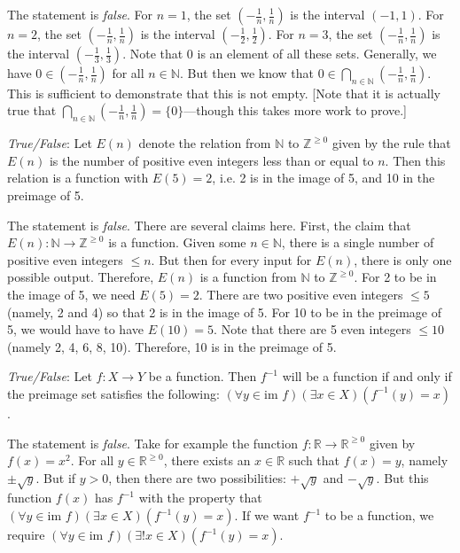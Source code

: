 \documentclass[11pt,letterpaper]{article}
\begin{document}
\sol The statement is \textit{false}. For $n= 1$, the set $(-\frac{1}{n}, \frac{1}{n})$ is the interval $(-1, 1)$. For $n= 2$, the set $(-\frac{1}{n}, \frac{1}{n})$ is the interval $(-\frac{1}{2}, \frac{1}{2})$. For $n= 3$, the set $(-\frac{1}{n}, \frac{1}{n})$ is the interval $(-\frac{1}{3}, \frac{1}{3})$. Note that $0$ is an element of all these sets. Generally, we have $0 \in (-\frac{1}{n}, \frac{1}{n})$ for all $n \in \mathbb{N}$. But then we know that $0 \in \displaystyle\bigcap_{n \in \mathbb{N}} \left( -\frac{1}{n}, \frac{1}{n} \right)$. This is sufficient to demonstrate that this is not empty. [Note that it is actually true that $\displaystyle\bigcap_{n \in \mathbb{N}} \left( -\frac{1}{n}, \frac{1}{n} \right)= \{ 0 \}$---though this takes more work to prove.] \pvspace{1.5cm}



\quizsol \textit{True/False}: Let $E(n)$ denote the relation from $\mathbb{N}$ to $\mathbb{Z}^{\geq 0}$ given by the rule that $E(n)$ is the number of positive even integers less than or equal to $n$. Then this relation is a function with $E(5)= 2$, i.e. 2 is in the image of 5, and 10 in the preimage of 5. \pspace

\sol The statement is \textit{false}. There are several claims here. First, the claim that $E(n): \mathbb{N} \to \mathbb{Z}^{\geq 0}$ is a function. Given some $n \in \mathbb{N}$, there is a single number of positive even integers $\leq n$. But then for every input for $E(n)$, there is only one possible output. Therefore, $E(n)$ is a function from $\mathbb{N}$ to $\mathbb{Z}^{\geq 0}$. For 2 to be in the image of 5, we need $E(5)= 2$. There are two positive even integers $\leq 5$ (namely, 2 and 4) so that 2 is in the image of 5. For 10 to be in the preimage of 5, we would have to have $E(10)= 5$. Note that there are 5 even integers $\leq 10$ (namely 2, 4, 6, 8, 10). Therefore, 10 is in the preimage of 5. \pvspace{1.5cm}




\quizsol \textit{True/False}: Let $f: X \to Y$ be a function. Then $f^{-1}$ will be a function if and only if the preimage set satisfies the following: $(\forall y \in \text{im } f)(\exists x \in X)(f^{-1}(y)= x)$. \pspace

\sol The statement is \textit{false}. Take for example the function $f: \mathbb{R} \to \mathbb{R}^{\geq 0}$ given by $f(x)= x^2$. For all $y \in \mathbb{R}^{\geq 0}$, there exists an $x \in \mathbb{R}$ such that $f(x)= y$, namely $\pm\sqrt{y}$. But if $y > 0$, then there are two possibilities: $+\sqrt{y}$ and $-\sqrt{y}$. But this function $f(x)$ has $f^{-1}$ with the property that $(\forall y \in \text{im }f)(\exists x \in X)(f^{-1}(y)= x)$. If we want $f^{-1}$ to be a function, we require $(\forall y \in \text{im }f)(\exists! x \in X)(f^{-1}(y)= x)$. 





\newpage




\end{document}
